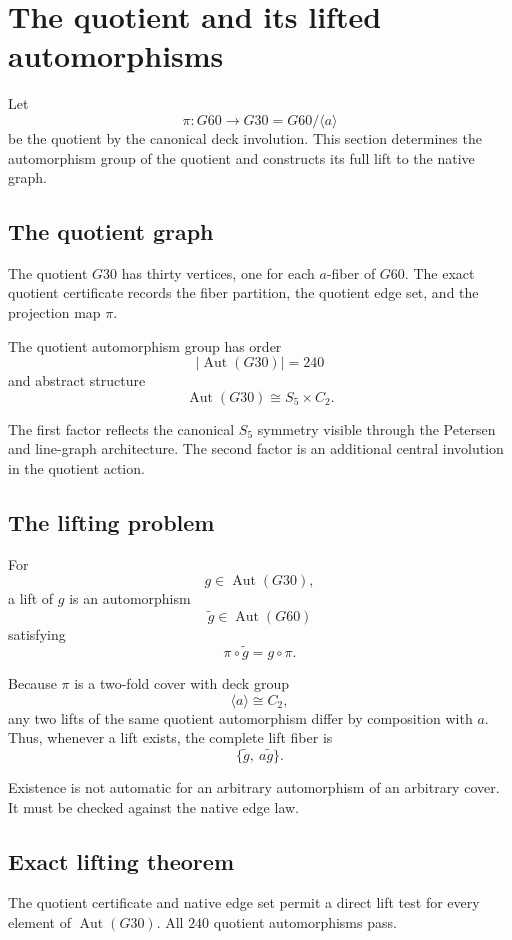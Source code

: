 \section{The quotient and its lifted automorphisms}
\label{sec:quotient-lift}

Let
\[
\pi\colon G60\longrightarrow G30=G60/\langle a\rangle
\]
be the quotient by the canonical deck involution. This section determines
the automorphism group of the quotient and constructs its full lift to
the native graph.

\subsection{The quotient graph}

The quotient $G30$ has thirty vertices, one for each $a$-fiber of $G60$.
The exact quotient certificate records the fiber partition, the quotient
edge set, and the projection map $\pi$.

The quotient automorphism group has order
\[
\left|\operatorname{Aut}(G30)\right|=240
\]
and abstract structure
\[
\operatorname{Aut}(G30)\cong S_5\times C_2.
\]

The first factor reflects the canonical $S_5$ symmetry visible through
the Petersen and line-graph architecture. The second factor is an
additional central involution in the quotient action.

\subsection{The lifting problem}

For
\[
g\in\operatorname{Aut}(G30),
\]
a lift of $g$ is an automorphism
\[
\widetilde g\in\operatorname{Aut}(G60)
\]
satisfying
\[
\pi\circ\widetilde g=g\circ\pi.
\]

Because $\pi$ is a two-fold cover with deck group
\[
\langle a\rangle\cong C_2,
\]
any two lifts of the same quotient automorphism differ by composition
with $a$. Thus, whenever a lift exists, the complete lift fiber is
\[
\{\widetilde g,\ a\widetilde g\}.
\]

Existence is not automatic for an arbitrary automorphism of an arbitrary
cover. It must be checked against the native edge law.

\subsection{Exact lifting theorem}

The quotient certificate and native edge set permit a direct lift test
for every element of $\operatorname{Aut}(G30)$. All $240$ quotient
automorphisms pass.

